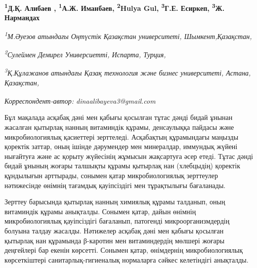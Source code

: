 
\begin{articleheader}

{\bfseries 
\textsuperscript{1}Д.Қ. Алибаев\textsuperscript{\envelope } ,
\textsuperscript{1}А.Ж. Иманбаев,
\textsuperscript{2}Hulya Gul,
\textsuperscript{3}Г.Е. Есиркеп,
\textsuperscript{3}Ж. Нармандах}
\end{articleheader}

\begin{affiliation}
\emph{\textsuperscript{1}М.Әуезов атындағы Оңтүстік Қазақстан университеті, Шымкент,Қазақстан,}

\emph{\textsuperscript{2}Сулеймен Демирел Универсиетті, Испарта, Турция,}

\emph{\textsuperscript{3}Қ.Құлажанов атындағы Қазақ технология және бизнес университеті, Астана, Қазақстан,}

\raggedright \textsuperscript{\envelope }{\em Корреспондент-автор: dinaalibayeva3@gmail.com}
\end{affiliation}

Бұл мақалада асқабақ дәні мен қабығы қосылған тұтас дәнді бидай ұнынан
жасалған қытырлақ нанның витаминдік құрамы, денсаулыққа пайдасы және
микробиологиялық қасиеттері зерттеледі. Асқабақтың құрамындағы маңызды
қоректік заттар, оның ішінде дәрумендер мен минералдар, иммундық жүйені
нығайтуға және ас қорыту жүйесінің жұмысын жақсартуға әсер етеді. Тұтас
дәнді бидай ұнының жоғары талшықты құрамы қытырлақ нан (хлебцыдің)
қоректік құндылығын арттырады, сонымен қатар микробиологиялық зерттеулер
нәтижесінде өнімнің тағамдық қауіпсіздігі мен тұрақтылығы бағаланады.

Зерттеу барысында қытырлақ нанның химиялық құрамы талданып, оның
витаминдік құрамы анықталды. Сонымен қатар, дайын өнімнің
микробиологиялық қауіпсіздігі бағаланып, патогенді микроорганизмдердің
болуына талдау жасалды. Нәтижелер асқабақ дәні мен қабығы қосылған
қытырлақ нан құрамында β-каротин мен витаминдердің мөлшері жоғары
деңгейлері бар екенін көрсетті. Сонымен қатар, өнімдернің
микробиологиялық көрсеткіштері санитарлық-гигиеналық нормаларға сәйкес
келетіндігі анықталды.

